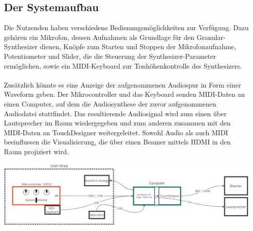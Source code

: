 \documentclass[12pt]{scrartcl}%
\theoremstyle{nonumberplain}
\begin{document}
\subsection{Der Systemaufbau}

Die Nutzenden haben verschiedene Bedienungsmöglichkeiten zur Verfügung. Dazu gehören ein Mikrofon, dessen Aufnahmen als Grundlage für den Granular-Synthesizer dienen, Knöpfe zum Starten und Stoppen der Mikrofonaufnahme, Potentiometer und Slider, die die Steuerung der Synthesizer-Parameter ermöglichen, sowie ein MIDI-Keyboard zur Tonhöhenkontrolle des Synthesizers.\\\\
Zusätzlich könnte es eine Anzeige der aufgenommenen Audiospur in Form einer Waveform geben. Der Mikrocontroller und das Keyboard senden MIDI-Daten an einen Computer, auf dem die Audiosynthese der zuvor aufgenommenen Audiodatei stattfindet. Das resultierende Audiosignal wird zum einen über Lautsprecher im Raum wiedergegeben und zum anderen zusammen mit den MIDI-Daten an TouchDesigner weitergeleitet. Sowohl Audio als auch MIDI beeinflussen die Visualisierung, die über einen Beamer mittels HDMI in den Raum projiziert wird.
\begin{center}
 \includegraphics[scale=0.43]{system_schaltbild_v1.png}
\end{center}


\newpage
\end{document}
